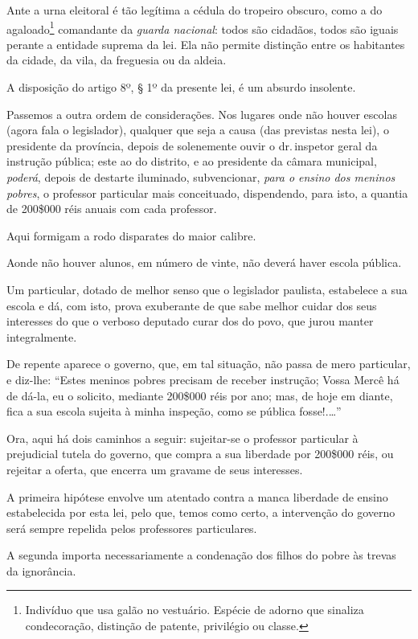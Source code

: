 Ante a urna eleitoral é tão legítima a cédula do tropeiro obscuro, como
a do agaloado\footnote{Indivíduo que usa galão no vestuário. Espécie
  de adorno que sinaliza condecoração, distinção de patente, privilégio
  ou classe.} comandante da \emph{guarda nacional}: todos são cidadãos,
todos são iguais perante a entidade suprema da lei. Ela não permite
distinção entre os habitantes da cidade, da vila, da freguesia ou da
aldeia.

A disposição do artigo 8º, § 1º da presente lei, é um absurdo insolente.

Passemos a outra ordem de considerações. Nos lugares onde não houver
escolas (agora fala o legislador), qualquer que seja a causa (das
previstas nesta lei), o presidente da província, depois de solenemente
ouvir o dr.\,inspetor geral da instrução pública; este ao do distrito, e
ao presidente da câmara municipal, \emph{poderá}, depois de destarte
iluminado, subvencionar, \emph{para o ensino dos meninos pobres}, o
professor particular mais conceituado, dispendendo, para isto, a quantia
de 200\$000 réis anuais com cada professor.

Aqui formigam a rodo disparates do maior calibre.

Aonde não houver alunos, em número de vinte, não deverá haver escola
pública.

Um particular, dotado de melhor senso que o legislador paulista,
estabelece a sua escola e dá, com isto, prova exuberante de que sabe
melhor cuidar dos seus interesses do que o verboso deputado curar dos do
povo, que jurou manter integralmente.

De repente aparece o governo, que, em tal situação, não passa de mero
particular, e diz-lhe: ``Estes meninos pobres precisam de receber
instrução; Vossa Mercê há de dá-la, eu o solicito, mediante 200\$000
réis por ano; mas, de hoje em diante, fica a sua escola sujeita à minha
inspeção, como se pública fosse!.\ldots''

Ora, aqui há dois caminhos a seguir: sujeitar-se o professor particular
à prejudicial tutela do governo, que compra a sua liberdade por 200\$000
réis, ou rejeitar a oferta, que encerra um gravame de seus interesses.

A primeira hipótese envolve um atentado contra a manca liberdade de
ensino estabelecida por esta lei, pelo que, temos como certo, a
intervenção do governo será sempre repelida pelos professores
particulares.

A segunda importa necessariamente a condenação dos filhos do pobre às
trevas da ignorância.

